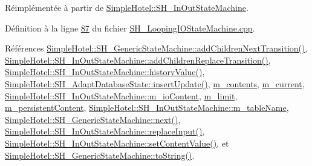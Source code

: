 Réimplémentée à partir de \hyperlink{classSimpleHotel_1_1SH__InOutStateMachine_aaf5afe04d6e4d3d5ebf0b5f1b00eddf1}{Simple\-Hotel\-::\-S\-H\-\_\-\-In\-Out\-State\-Machine}.



Définition à la ligne \hyperlink{SH__LoopingIOStateMachine_8cpp_source_l00087}{87} du fichier \hyperlink{SH__LoopingIOStateMachine_8cpp_source}{S\-H\-\_\-\-Looping\-I\-O\-State\-Machine.\-cpp}.



Références \hyperlink{classSimpleHotel_1_1SH__GenericStateMachine_a3771c91002bec6ab9414703251cc7825}{Simple\-Hotel\-::\-S\-H\-\_\-\-Generic\-State\-Machine\-::add\-Children\-Next\-Transition()}, \hyperlink{classSimpleHotel_1_1SH__InOutStateMachine_a3339fd43658e6ac0979bd43014785766}{Simple\-Hotel\-::\-S\-H\-\_\-\-In\-Out\-State\-Machine\-::add\-Children\-Replace\-Transition()}, \hyperlink{classSimpleHotel_1_1SH__InOutStateMachine_af9de98943b9428ed4144bc6695c1ada0}{Simple\-Hotel\-::\-S\-H\-\_\-\-In\-Out\-State\-Machine\-::history\-Value()}, \hyperlink{classSimpleHotel_1_1SH__AdaptDatabaseState_af125e11b83df08b8e67f90c55c69d583}{Simple\-Hotel\-::\-S\-H\-\_\-\-Adapt\-Database\-State\-::insert\-Update()}, \hyperlink{classSimpleHotel_1_1SH__LoopingInOutStateMachine_a46c3dab932ceedeef821a25fa8d6e5dd}{m\-\_\-contents}, \hyperlink{classSimpleHotel_1_1SH__LoopingInOutStateMachine_a700a3c54ef593c94815a0418d83dd381}{m\-\_\-current}, \hyperlink{classSimpleHotel_1_1SH__InOutStateMachine_a4b0a3a48b0da31fddb724a357ad9b52c}{Simple\-Hotel\-::\-S\-H\-\_\-\-In\-Out\-State\-Machine\-::m\-\_\-io\-Content}, \hyperlink{classSimpleHotel_1_1SH__LoopingInOutStateMachine_ae5e496343aed89d7062e2478218f4e7d}{m\-\_\-limit}, \hyperlink{classSimpleHotel_1_1SH__LoopingInOutStateMachine_a6ed5f5c62373711ce123fb1a97fc3387}{m\-\_\-persistent\-Content}, \hyperlink{classSimpleHotel_1_1SH__InOutStateMachine_a15c063debdaa4c87bd4925867a13ce9e}{Simple\-Hotel\-::\-S\-H\-\_\-\-In\-Out\-State\-Machine\-::m\-\_\-table\-Name}, \hyperlink{classSimpleHotel_1_1SH__GenericStateMachine_a2de14d4920ae8c10b70c2d73fc2d4a93}{Simple\-Hotel\-::\-S\-H\-\_\-\-Generic\-State\-Machine\-::next()}, \hyperlink{classSimpleHotel_1_1SH__InOutStateMachine_a9117d781c5f8bc02d8b2eba359b0e85a}{Simple\-Hotel\-::\-S\-H\-\_\-\-In\-Out\-State\-Machine\-::replace\-Input()}, \hyperlink{classSimpleHotel_1_1SH__InOutStateMachine_aaf92da452f6cf7cc57aa9e60f88322e4}{Simple\-Hotel\-::\-S\-H\-\_\-\-In\-Out\-State\-Machine\-::set\-Content\-Value()}, et \hyperlink{classSimpleHotel_1_1SH__GenericStateMachine_ad6dd1d0986c40684410ed94f1f610b12}{Simple\-Hotel\-::\-S\-H\-\_\-\-Generic\-State\-Machine\-::to\-String()}.



